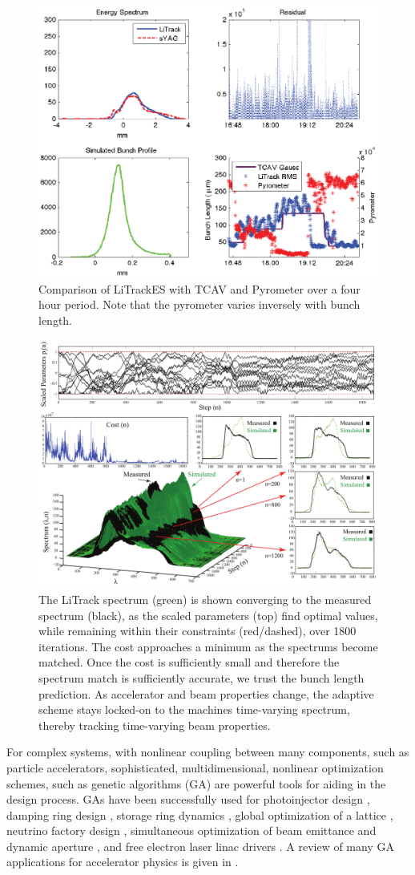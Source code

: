 \documentclass[%
twocolumn,
showpacs,preprintnumbers,
 aps,
prstab,
]{revtex4-1}
\begin{document}
\begin{figure}[!t] 
    \centering
    \includegraphics[width=.45\textwidth]{f3}
    \caption{Comparison of LiTrackES with TCAV and Pyrometer over a four hour period. Note that the pyrometer varies inversely with bunch length.}
    \label{fig:fc}
\end{figure}


\begin{figure}[!t] 
    \centering
    \includegraphics[width=.98\textwidth]{3D_All}
    \caption{The LiTrack spectrum (green) is shown converging to the measured spectrum (black), as the scaled parameters (top) find optimal values, while remaining within their constraints (red/dashed), over 1800 iterations. The cost approaches a minimum as the spectrums become matched. Once the cost is sufficiently small and therefore the spectrum match is sufficiently accurate, we trust the bunch length prediction. As accelerator and beam properties change, the adaptive scheme stays locked-on to the machines time-varying spectrum, thereby tracking time-varying beam properties.}
    \label{fig:spectconv}
\end{figure}

For complex systems, with nonlinear coupling between many components, such as particle accelerators, sophisticated, multidimensional, nonlinear optimization schemes, such as genetic algorithms (GA) \cite{ref-GA-1} are powerful tools for aiding in the design process. GAs have been successfully used for photoinjector design \cite{ref-GA-2}, damping ring design \cite{ref-GA-25}, storage ring dynamics \cite{ref-GA-275}, global optimization of a lattice \cite{ref-GA-3}, neutrino factory design \cite{ref-GA-4}, simultaneous optimization of beam emittance and dynamic aperture \cite{ref-GA-5}, and free electron laser linac drivers \cite{ref-GA-6}. A review of many GA applications for accelerator physics is given in \cite{ref-GA-7}.
\end{document}
